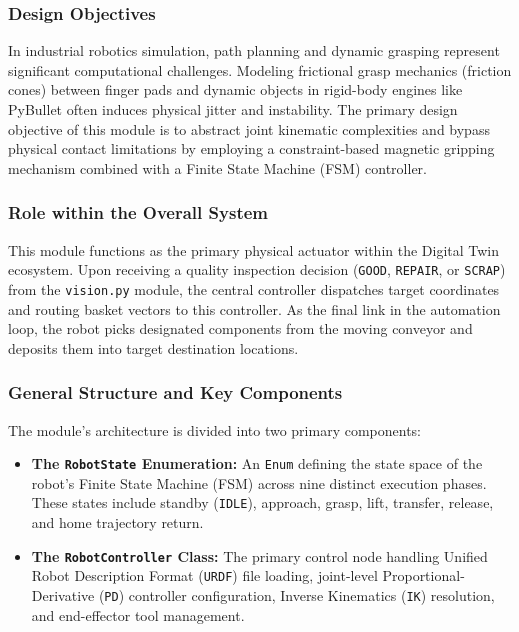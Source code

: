 \documentclass{article}
\begin{document}
\subsubsection{Design Objectives}
In industrial robotics simulation, path planning and dynamic grasping represent significant computational challenges. Modeling frictional grasp mechanics (friction cones) between finger pads and dynamic objects in rigid-body engines like PyBullet often induces physical jitter and instability. The primary design objective of this module is to abstract joint kinematic complexities and bypass physical contact limitations by employing a constraint-based magnetic gripping mechanism combined with a Finite State Machine (FSM) controller.

\subsubsection{Role within the Overall System}
This module functions as the primary physical actuator within the Digital Twin ecosystem. Upon receiving a quality inspection decision (\texttt{GOOD}, \texttt{REPAIR}, or \texttt{SCRAP}) from the \texttt{vision.py} module, the central controller dispatches target coordinates and routing basket vectors to this controller. As the final link in the automation loop, the robot picks designated components from the moving conveyor and deposits them into target destination locations.

\subsubsection{General Structure and Key Components}
The module's architecture is divided into two primary components:

\begin{itemize}
	\item \textbf{The \texttt{RobotState} Enumeration:} An \texttt{Enum} defining the state space of the robot's Finite State Machine (FSM) across nine distinct execution phases. These states include standby (\texttt{IDLE}), approach, grasp, lift, transfer, release, and home trajectory return.
	\item \textbf{The \texttt{RobotController} Class:} The primary control node handling Unified Robot Description Format (\texttt{URDF}) file loading, joint-level Proportional-Derivative (\texttt{PD}) controller configuration, Inverse Kinematics (\texttt{IK}) resolution, and end-effector tool management.
\end{itemize}
\end{document}
